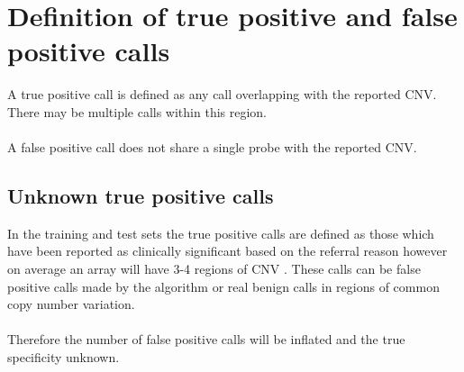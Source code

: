 \section{Definition of true positive and false positive calls}
A true positive call is defined as any call overlapping with the reported CNV. There may be multiple calls within this region.
\paragraph*{}
A false positive call does not share a single probe with the reported CNV.

\subsection{Unknown true positive calls}
In the training and test sets the true positive calls are defined as those which have been reported as clinically significant based on the referral reason however on average an array will have 3-4 regions of CNV \cite{joowook_ahn_average_2015}. These calls can be false positive calls made by the algorithm or real benign calls in regions of common copy number variation.
\paragraph*{}
Therefore the number of false positive calls will be inflated and the true specificity unknown.